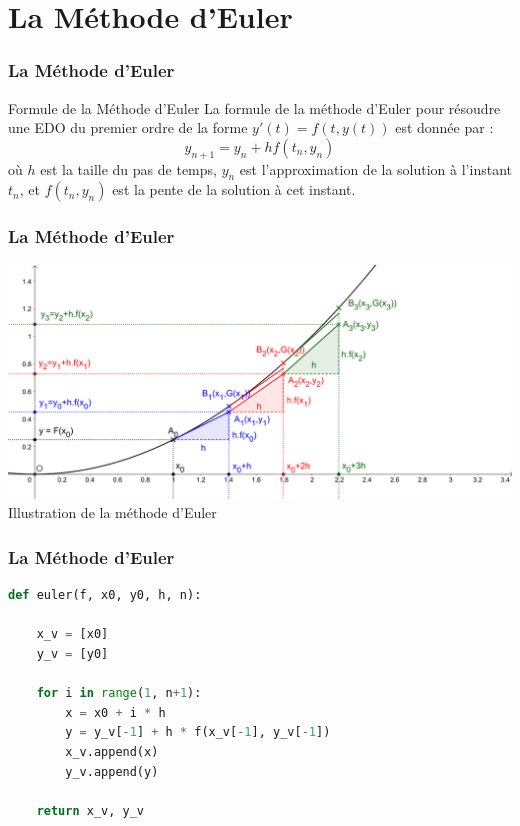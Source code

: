 \documentclass{beamer}
\begin{document}
\section{La Méthode d'Euler}
\begin{frame}
\frametitle{La Méthode d'Euler}

\begin{block}{Formule de la Méthode d'Euler}
La formule de la méthode d'Euler pour résoudre une EDO du premier ordre de la forme $y'(t) = f(t, y(t))$ est donnée par :
\[ y_{n+1} = y_n + hf(t_n, y_n) \]
où $h$ est la taille du pas de temps, $y_n$ est l'approximation de la solution à l'instant $t_n$, et $f(t_n, y_n)$ est la pente de la solution à cet instant.
\end{block}


\end{frame}

\begin{frame}
\frametitle{La Méthode d'Euler}
\begin{center}
\includegraphics[scale=0.3]{Integration_x_div_2.png}\\
Illustration de la méthode d'Euler
\end{center}
\end{frame}
 
\begin{frame}[fragile]
\frametitle{La Méthode d'Euler}
\begin{lstlisting}[language=Python]
def euler(f, x0, y0, h, n):

    x_v = [x0] 
    y_v = [y0]  
    
    for i in range(1, n+1):
        x = x0 + i * h
        y = y_v[-1] + h * f(x_v[-1], y_v[-1])
        x_v.append(x)
        y_v.append(y)
    
    return x_v, y_v
\end{lstlisting}
\end{frame}
\end{document}
